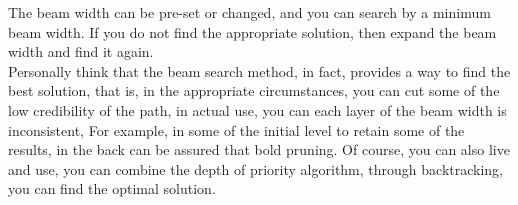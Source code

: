The beam width can be pre-set or changed, and you can search by a minimum beam width. If you do not find the appropriate solution, then expand the beam width and find it again.\\
Personally think that the beam search method, in fact, provides a way to find the best solution, that is, in the appropriate circumstances, you can cut some of the low credibility of the path, in actual use, you can each layer of the beam width is inconsistent, For example, in some of the initial level to retain some of the results, in the back can be assured that bold pruning. Of course, you can also live and use, you can combine the depth of priority algorithm, through backtracking, you can find the optimal solution.
